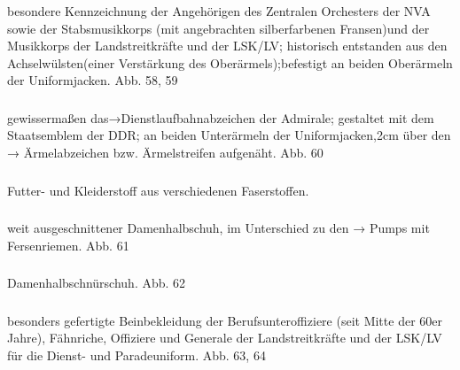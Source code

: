 \subsubsection*{}%

besondere Kennzeichnung der Angehörigen des Zentralen Orchesters der NVA sowie der Stabsmusikkorps (mit angebrachten silberfarbenen Fransen)und der Musikkorps der Landstreitkräfte und der LSK/LV; historisch entstanden aus den Achselwülsten(einer Verstärkung des Oberärmels);befestigt an beiden Oberärmeln der Uniformjacken. Abb. 58, 59

\subsubsection*{}%

gewissermaßen das→Dienstlaufbahnabzeichen der Admirale; gestaltet mit dem Staatsemblem der DDR; an beiden Unterärmeln der Uniformjacken,2cm über den → Ärmelabzeichen bzw. Ärmelstreifen aufgenäht. Abb. 60

\subsubsection*{}%

Futter- und Kleiderstoff aus verschiedenen Faserstoffen.

\subsubsection*{}%

weit ausgeschnittener Damenhalbschuh, im Unterschied zu den → Pumps mit Fersenriemen. Abb. 61

\subsubsection*{}%

Damenhalbschnürschuh. Abb. 62

\subsubsection*{}%

besonders gefertigte Beinbekleidung der Berufsunteroffiziere (seit Mitte der 60er Jahre), Fähnriche, Offiziere und Generale der Landstreitkräfte und der LSK/LV für die Dienst- und Paradeuniform. Abb. 63, 64

\subsubsection*{}%

